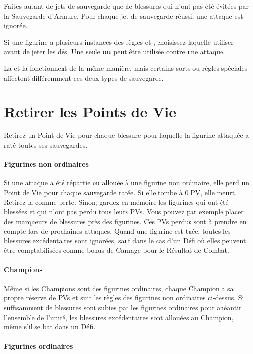Faites autant de jets de sauvegarde que de blessures qui n'ont pas été évitées par la Sauvegarde d'Armure. Pour chaque jet de sauvegarde réussi, une attaque est ignorée.

Si une figurine a plusieurs instances des règles \regeneration{} et \wardsave{}, choisissez laquelle utiliser avant de jeter les dés. Une seule \regeneration{} \textbf{ou} \wardsave{} peut être utilisée contre une attaque.

La \regeneration{} et la \wardsave{} fonctionnent de la même manière, mais certains sorts ou règles spéciales affectent différemment ces deux types de sauvegarde.

\newpage
\section{Retirer les Points de Vie}

Retirez un Point de Vie pour chaque blessure pour laquelle la figurine attaquée a raté toutes ses sauvegardes.

\paragraph{Figurines non ordinaires}

Si une attaque a été répartie ou allouée à une figurine non ordinaire, elle perd un Point de Vie pour chaque sauvegarde ratée. Si elle tombe à 0 PV, elle meurt. Retirez-la comme perte. Sinon, gardez en mémoire les figurines qui ont été blessées et qui n'ont pas perdu tous leurs PVs. Vous pouvez par exemple placer des marqueurs de blessures près des figurines. Ces PVs perdus sont à prendre en compte lors de prochaines attaques. Quand une figurine est tuée, toutes les blessures excédentaires sont ignorées, sauf dans le cas d'un Défi où elles peuvent être comptabilisées comme bonus de Carnage pour le Résultat de Combat. 

\paragraph{Champions}

Même si les Champions sont des figurines ordinaires, chaque Champion a sa propre réserve de PVs et suit les règles des figurines non ordinaires ci-dessus. Si suffisamment de blessures sont subies par les figurines ordinaires pour anéantir l'ensemble de l'unité, les blessures excédentaires sont allouées au Champion, même s'il se bat dans un Défi.

\paragraph{Figurines ordinaires}

